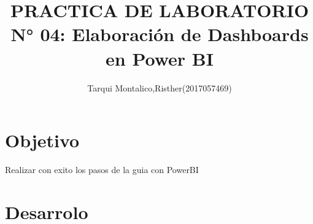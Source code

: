 \documentclass[preprint,12pt]{elsarticle}
\begin{document}
	
	\begin{frontmatter}

		\title{\huge PRACTICA DE LABORATORIO N° 04: Elaboración de Dashboards en Power BI	 }
		\author{	Tarqui Montalico,Risther(2017057469)}
		
		





\end{frontmatter}

\section{Objetivo}
	
	Realizar con exito los pasos de la guia con PowerBI

\section{Desarrolo}
\end{document}
